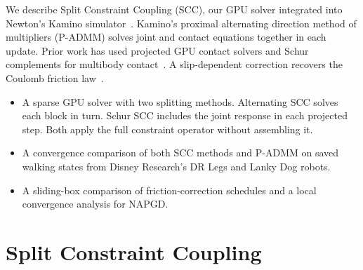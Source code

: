 \documentclass[conference]{IEEEtran}
\begin{document}
We describe Split Constraint Coupling (SCC), our GPU solver integrated into Newton's Kamino simulator~\citep{kamino,newton}. Kamino's proximal alternating direction method of multipliers (P-ADMM) solves joint and contact equations together in each update. Prior work has used projected GPU contact solvers and Schur complements for multibody contact~\citep{tasoragpu,mazhar,peiret}. A slip-dependent correction recovers the Coulomb friction law~\citep{acary,melanz,daviet,bogus}.
\begin{itemize}
\item A sparse GPU solver with two splitting methods. Alternating SCC solves each block in turn. Schur SCC includes the joint response in each projected step. Both apply the full constraint operator without assembling it.
\item A convergence comparison of both SCC methods and P-ADMM on saved walking states from Disney Research's DR Legs and Lanky Dog robots.
\item A sliding-box comparison of friction-correction schedules and a local convergence analysis for NAPGD.
\end{itemize}

\section{Split Constraint Coupling}
\end{document}
